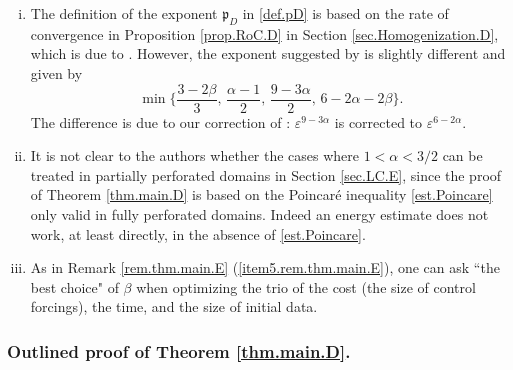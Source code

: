 \documentclass[11pt,a4paper]{article}
\numberwithin{equation}{section}
\newcommand{\eps}{\varepsilon}
\begin{document}
\begin{remark}\label{rem.thm.main.D}
\begin{enumerate}[(i)]
\item\label{item1.rem.thm.main.D}
The definition of the exponent $\mathfrak p_D$ in \eqref{def.pD} is based on the rate of convergence in Proposition \ref{prop.RoC.D} in Section \ref{sec.Homogenization.D}, which is due to \cite[Theorem 1.3]{Hof23}. However, the exponent suggested by \cite[Theorem 1.3]{Hof23} is slightly different and given by
\[
    \min\Big\{\frac{3-2\beta}{3},\, \frac{\alpha-1}{2},\, \frac{9-3\alpha}{2},\, 6-2\alpha-2\beta\Big\}.
\]
The difference is due to our correction of \cite[(3.16)]{Hof23}: $\eps^{9-3\alpha}$ is corrected to $\eps^{6-2\alpha}$. 


\item\label{item2.rem.thm.main.D}
It is not clear to the authors whether the cases where $1 < \alpha < 3/2$ can be treated in partially perforated domains in Section \ref{sec.LC.E}, since the proof of Theorem \ref{thm.main.D} is based on the Poincaré inequality \eqref{est.Poincare} only valid in fully perforated domains. Indeed an energy estimate does not work, at least directly, in the absence of \eqref{est.Poincare}. 


\item\label{item3.rem.thm.main.D}
As in Remark \ref{rem.thm.main.E} (\ref{item5.rem.thm.main.E}), one can ask ``the best choice" of $\beta$ when optimizing the trio of the cost (the size of control forcings), the time, and the size of initial data. 
\end{enumerate}
\end{remark}


    \subsubsection*{Outlined proof of Theorem \ref{thm.main.D}.}
\end{document}
